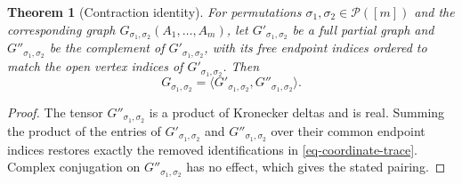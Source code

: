 \documentclass[12pt]{article}
\numberwithin{equation}{section}
\theoremstyle{plain}
\newtheorem*{theorem*}{Theorem}
\def\cP{\mathcal P}
\begin{document}
\begin{theorem*}[Contraction identity]
For permutations $\sigma_1,\sigma_2\in\cP([m])$ and the corresponding graph $G_{\sigma_1,\sigma_2}(A_1,\ldots,A_m)$, let $G'_{\sigma_1,\sigma_2}$ be a full partial graph and $G''_{\sigma_1,\sigma_2}$ be the complement of $G'_{\sigma_1,\sigma_2}$, with its free endpoint indices ordered to match the open vertex indices of $G'_{\sigma_1,\sigma_2}$. Then
\[
G_{\sigma_1,\sigma_2} =\langle G'_{\sigma_1,\sigma_2}, G''_{\sigma_1,\sigma_2} \rangle.
\]
\end{theorem*}
\begin{proof}
The tensor $G''_{\sigma_1,\sigma_2}$ is a product of Kronecker deltas and is real. Summing the product of the entries of $G'_{\sigma_1,\sigma_2}$ and $G''_{\sigma_1,\sigma_2}$ over their common endpoint indices restores exactly the removed identifications in \eqref{eq-coordinate-trace}. Complex conjugation on $G''_{\sigma_1,\sigma_2}$ has no effect, which gives the stated pairing.
\end{proof}
\end{document}
